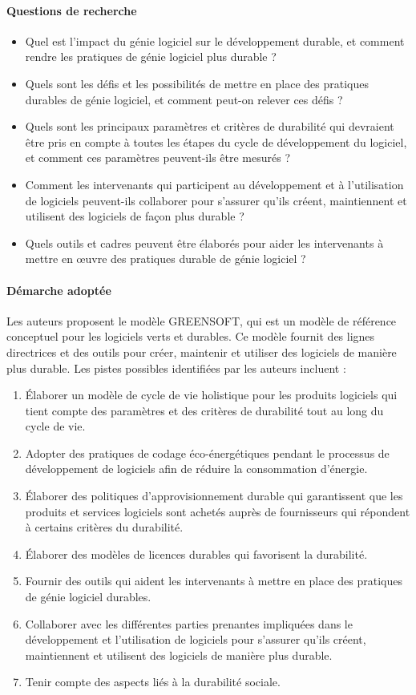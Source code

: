 \paragraph{Questions de recherche}
\begin{itemize}
    \item Quel est l'impact du génie logiciel sur le développement durable, et comment rendre les pratiques de génie logiciel plus durable ?
    \item Quels sont les défis et les possibilités de mettre en place des pratiques durables de génie logiciel, et comment peut-on relever ces défis ?
    \item Quels sont les principaux paramètres et critères de durabilité qui devraient être pris en compte à toutes les étapes du cycle de développement du logiciel, et comment ces paramètres peuvent-ils être mesurés ?
    \item Comment les intervenants qui participent au développement et à l'utilisation de logiciels peuvent-ils collaborer pour s'assurer qu'ils créent, maintiennent et utilisent des logiciels de façon plus durable ?
    \item Quels outils et cadres peuvent être élaborés pour aider les intervenants à mettre en œuvre des pratiques durable de génie logiciel ?
\end{itemize}

\paragraph{Démarche adoptée}
Les auteurs proposent le modèle GREENSOFT, qui est un modèle de référence conceptuel pour les logiciels verts et durables. Ce modèle fournit des lignes directrices et des outils pour créer, maintenir et utiliser des logiciels de manière plus durable. Les pistes possibles identifiées par les auteurs incluent :
\begin{enumerate}
    \item Élaborer un modèle de cycle de vie holistique pour les produits logiciels qui tient compte des paramètres et des critères de durabilité tout au long du cycle de vie.
    \item Adopter des pratiques de codage éco-énergétiques pendant le processus de développement de logiciels afin de réduire la consommation d'énergie.
    \item Élaborer des politiques d'approvisionnement durable qui garantissent que les produits et services logiciels sont achetés auprès de fournisseurs qui répondent à certains critères du durabilité.
    \item Élaborer des modèles de licences durables qui favorisent la durabilité.
    \item Fournir des outils qui aident les intervenants à mettre en place des pratiques de génie logiciel durables.
    \item Collaborer avec les différentes parties prenantes impliquées dans le développement et l'utilisation de logiciels pour s'assurer qu'ils créent, maintiennent et utilisent des logiciels de manière plus durable.
    \item Tenir compte des aspects liés à la durabilité sociale.
\end{enumerate}

